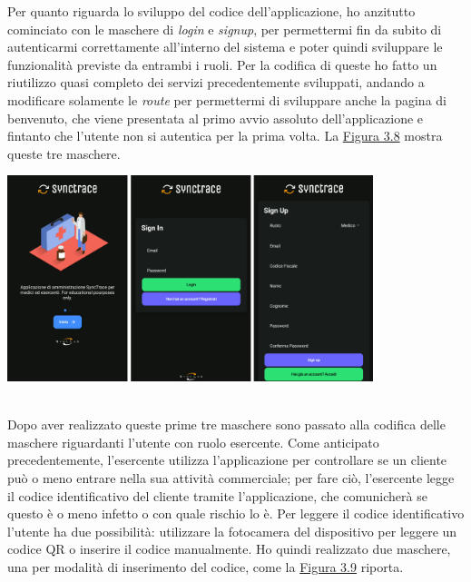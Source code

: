 Per quanto riguarda lo sviluppo del codice dell'applicazione, ho anzitutto cominciato con le maschere di \textit{login} e \textit{signup}, per permettermi fin da subito di autenticarmi correttamente all'interno del sistema e poter quindi sviluppare le funzionalità previste da entrambi i ruoli. Per la codifica di queste ho fatto un riutilizzo quasi completo dei servizi precedentemente sviluppati, andando a modificare solamente le \textit{route} per permettermi di sviluppare anche la pagina di benvenuto, che viene presentata al primo avvio assoluto dell'applicazione e fintanto che l'utente non si autentica per la prima volta. La \hyperref[img:welcomeloginsignup]{Figura 3.8} mostra queste tre maschere. \\

\begin{minipage}{\linewidth}
  \label{img:welcomeloginsignup}
  \centering
    \includegraphics[height=6cm]{immagini/app/welcomeloginsignup}
\end{minipage}\\

Dopo aver realizzato queste prime tre maschere sono passato alla codifica delle maschere riguardanti l'utente con ruolo esercente. Come anticipato precedentemente, l'esercente utilizza l'applicazione per controllare se un cliente può o meno entrare nella sua attività commerciale; per fare ciò, l'esercente legge il codice identificativo del cliente tramite l'applicazione, che comunicherà se questo è o meno infetto o con quale rischio lo è. Per leggere il codice identificativo l'utente ha due possibilità: utilizzare la fotocamera del dispositivo per leggere un codice QR o inserire il codice manualmente. Ho quindi realizzato due maschere, una per modalità di inserimento del codice, come la \hyperref[img:es]{Figura 3.9} riporta.\\

